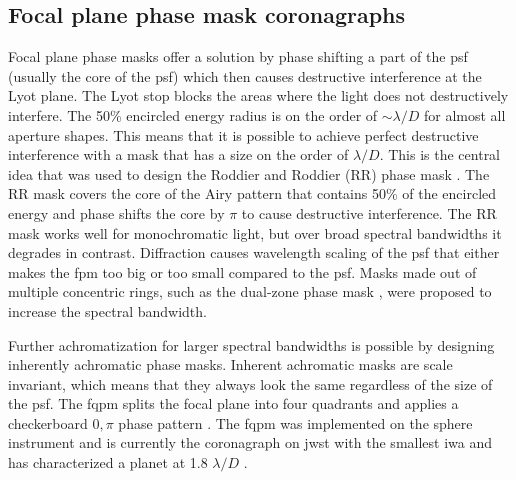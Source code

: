 \documentclass[letterpaper]{ar-1col}
\newcommand{\ld}{$\lambda/D$}
\newcommand{\acc}[1]{\entry{\acs{#1}}{\acl{#1}}}
\begin{document}
\subsection{Focal plane phase mask coronagraphs}

Focal plane phase masks offer a solution by phase shifting a part of the \ac{psf} (usually the core of the \ac{psf}) which then causes destructive interference at the Lyot plane.
%
The Lyot stop blocks the areas where the light does not destructively interfere.
%
The 50\% encircled energy radius is on the order of $\sim$\ld{} for almost all aperture shapes.
%
This means that it is possible to achieve perfect destructive interference with a mask that has a size on the order of \ld{}.
%
This is the central idea that was used to design the Roddier and Roddier (RR) phase mask \citep{roddier1997stellar}.
%
The RR mask covers the core of the Airy pattern that contains 50\% of the encircled energy and phase shifts the core by $\pi$ to cause destructive interference.
%
The RR mask works well for monochromatic light, but over broad spectral bandwidths it degrades in contrast.
%
Diffraction causes wavelength scaling of the \ac{psf} that either makes the \ac{fpm} too big or too small compared to the \ac{psf}.
%
Masks made out of multiple concentric rings, such as the dual-zone phase mask \citep{soummer2003achromatic}, were proposed to increase the spectral bandwidth.

\begin{armarginnote}[]
\acc{ovc}
\acc{fqpm}
\acc{agpm}
\end{armarginnote}

Further achromatization for larger spectral bandwidths is possible by designing inherently achromatic phase masks.
%
Inherent achromatic masks are scale invariant, which means that they always look the same regardless of the size of the \ac{psf}.
%
The \ac{fqpm} splits the focal plane into four quadrants and applies a checkerboard $0,\pi$ phase pattern \citep{Riaud00}.
%
The \ac{fqpm} was implemented on the \ac{sphere} instrument \citep{Boccaletti04} and is currently the coronagraph on \ac{jwst} with the smallest \ac{iwa} and has characterized a planet at 1.8 \ld{} \citep{franson2024jwst}. 
\end{document}
